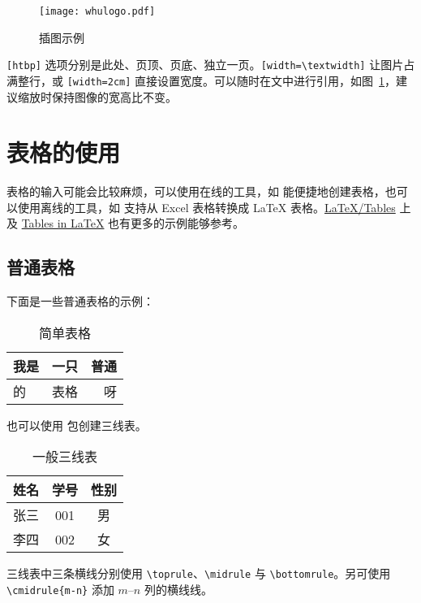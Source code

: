 \begin{figure}[!htb]
  \centering
  \texttt{[image: whulogo.pdf]}
  \caption{插图示例}
  \label{fig:whu}
\end{figure}

\verb|[htbp]| 选项分别是此处、页顶、页底、独立一页。\verb|[width=\textwidth]| 让图片占满整行，或 \verb|[width=2cm]| 直接设置宽度。可以随时在文中进行引用，如图~\ref{fig:whu}，建议缩放时保持图像的宽高比不变。

\section{表格的使用}
表格的输入可能会比较麻烦，可以使用在线的工具，如 \href{https://www.tablesgenerator.com/}{} 能便捷地创建表格，也可以使用离线的工具，如 \href{https://ctan.org/pkg/excel2latex}{} 支持从 Excel 表格转换成 \LaTeX{} 表格。\href{https://en.wikibooks.org/wiki/LaTeX/Tables}{LaTeX/Tables} 上及 \href{https://www.tug.org/pracjourn/2007-1/mori/mori.pdf}{Tables in LaTeX} 也有更多的示例能够参考。

\subsection{普通表格}
下面是一些普通表格的示例：

\begin{table}[ht]
  \centering
  \caption{简单表格}
  \label{tab:1}
  \begin{tabular}{|l|c|r|}
    \hline
    我是 & 一只 & 普通 \\
    \hline
    的   & 表格 & 呀   \\
    \hline
  \end{tabular}
\end{table}

也可以使用  包创建三线表。

\begin{table}[ht]
  \centering
  \caption{一般三线表}
  \label{tab:2}
  \begin{tabular}{ccc}
    \toprule
    姓名 & 学号 & 性别 \\
    \midrule
    张三 & 001  & 男   \\
    李四 & 002  & 女   \\
    \bottomrule
  \end{tabular}
\end{table}

三线表中三条横线分别使用 \verb|\toprule|、\verb|\midrule| 与 \verb|\bottomrule|。另可使用 \verb|\cmidrule{m-n}| 添加 \(m\)--\(n\) 列的横线线。

